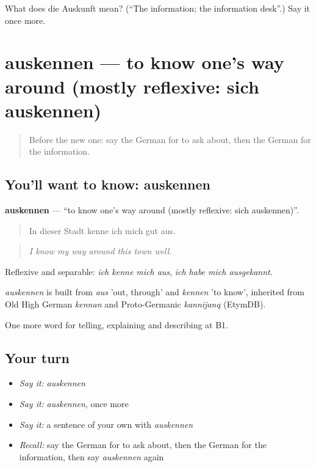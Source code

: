 \begin{tcolorbox}[breakable,colback=teal!4,colframe=teal!35!black,title={Before you move on}]
What does die Auskunft mean? (\textquotedblleft{}The information; the information desk\textquotedblright{}.) Say it once more.
\end{tcolorbox}
\section[auskennen]{auskennen — to know one's way around (mostly reflexive: sich auskennen)}

\label{lesson:GE-C437-auskennen}



\begin{quote}
Before the new one: say the German for to ask about, then the German for the information.
\end{quote}

\subsection*{You'll want to know: auskennen}
\textbf{auskennen} — \textquotedblleft{}to know one's way around (mostly reflexive: sich auskennen)\textquotedblright{}.

\begin{quote}
In dieser Stadt kenne ich mich gut aus.
\end{quote}

\begin{quote}
\emph{I know my way around this town well.}
\end{quote}

Reflexive and separable: \emph{ich kenne mich aus}, \emph{ich habe mich ausgekannt}.

\begin{cousinweb}
\emph{auskennen} is built from \emph{aus} 'out, through' and \emph{kennen} 'to know', inherited from Old High German \emph{kennan} and Proto-Germanic \emph{kannijaną} (EtymDB).
\end{cousinweb}

\begin{grammarlens}[title={What you've built}]
One more word for telling, explaining and describing at B1.
\end{grammarlens}

\subsection*{Your turn}
\begin{itemize}
\raggedright
  \item \emph{Say it:} \emph{auskennen}
  \item \emph{Say it:} \emph{auskennen}, once more
  \item \emph{Say it:} a sentence of your own with \emph{auskennen}
  \item \emph{Recall:} say the German for to ask about, then the German for the information, then say \emph{auskennen} again
\end{itemize}


